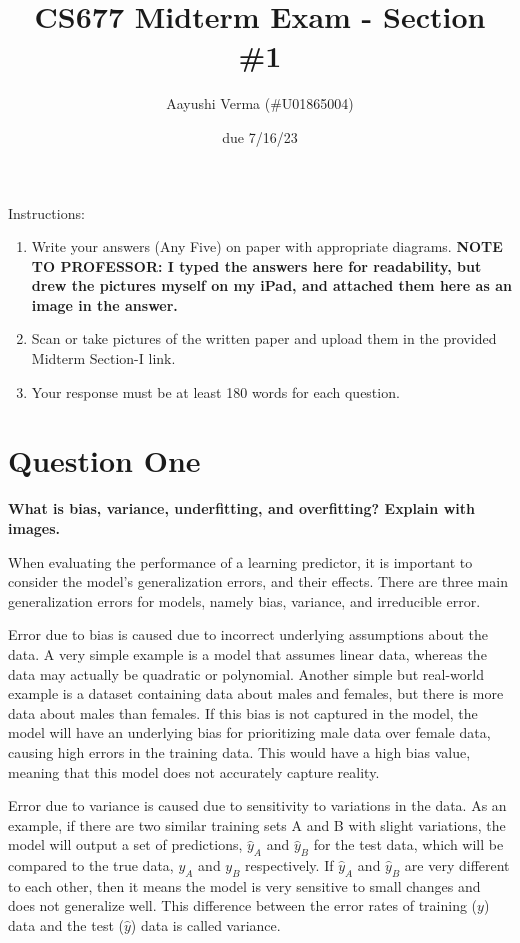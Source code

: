 \documentclass{article}
\title{CS677 Midterm Exam - Section \#1}
\author{Aayushi Verma (\#U01865004)}
\date{due 7/16/23}
\begin{document}
\maketitle

Instructions:

\begin{enumerate}
    \item Write your answers (Any Five) on paper with appropriate diagrams. \textbf{NOTE TO PROFESSOR: I typed the answers here for readability, but drew the pictures myself on my iPad, and attached them here as an image in the answer.}
    \item Scan or take pictures of the written paper and upload them in the provided Midterm Section-I link.
    \item Your response must be at least 180 words for each question.
\end{enumerate}

\section{Question One}
\noindent \textbf{What is bias, variance, underfitting, and overfitting? Explain with images.}

When evaluating the performance of a learning predictor, it is important to consider the model's generalization errors, and their effects. There are three main generalization errors for models, namely bias, variance, and irreducible error.

Error due to bias is caused due to incorrect underlying assumptions about the data. A very simple example is a model that assumes linear data, whereas the data may actually be quadratic or polynomial. Another simple but real-world example is a dataset containing data about males and females, but there is more data about males than females. If this bias is not captured in the model, the model will have an underlying bias for prioritizing male data over female data, causing high errors in the training data. This would have a high bias value, meaning that this model does not accurately capture reality.

Error due to variance is caused due to sensitivity to variations in the data. As an example, if there are two similar training sets A and B with slight variations, the model will output a set of predictions, $\hat{y}_A$ and $\hat{y}_B$ for the test data, which will be compared to the true data, $y_A$ and $y_B$ respectively. If $\hat{y}_A$ and $\hat{y}_B$ are very different to each other, then it means the model is very sensitive to small changes and does not generalize well. This difference between the error rates of training ($y$) data and the test ($\hat{y}$) data is called variance.
\end{document}
